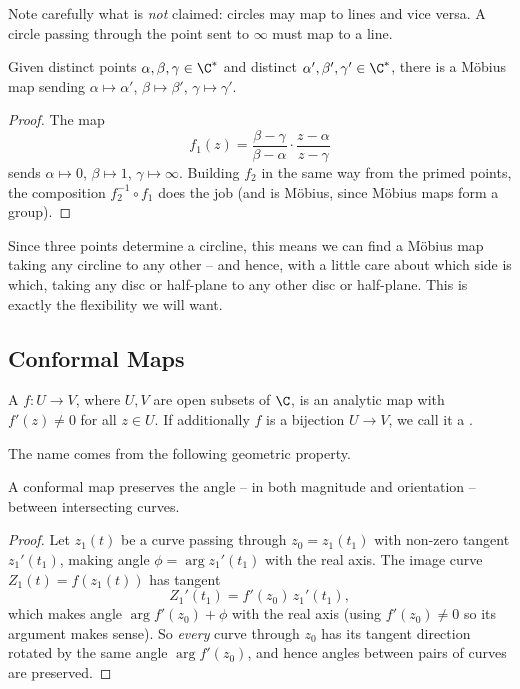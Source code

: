 Note carefully what is \emph{not} claimed: circles may map to lines and vice versa. A circle passing through the point sent to $\infty$ must map to a line.

\begin{proposition}
	Given distinct points $\alpha, \beta, \gamma \in \C^*$ and distinct $\alpha', \beta', \gamma' \in \C^*$, there is a M\"obius map sending $\alpha \mapsto \alpha'$, $\beta \mapsto \beta'$, $\gamma \mapsto \gamma'$.
\end{proposition}
\begin{proof}
	The map
	$$
	f_1(z) = \frac{\beta - \gamma}{\beta - \alpha} \cdot \frac{z - \alpha}{z - \gamma}
	$$
	sends $\alpha \mapsto 0$, $\beta \mapsto 1$, $\gamma \mapsto \infty$. Building $f_2$ in the same way from the primed points, the composition $f_2^{-1} \circ f_1$ does the job (and is M\"obius, since M\"obius maps form a group).
\end{proof}

Since three points determine a circline, this means we can find a M\"obius map taking any circline to any other -- and hence, with a little care about which side is which, taking any disc or half-plane to any other disc or half-plane. This is exactly the flexibility we will want.

\subsection{Conformal Maps}

\begin{definition}
	A  $f : U \to V$, where $U, V$ are open subsets of $\C$, is an analytic map with $f'(z) \neq 0$ for all $z \in U$. If additionally $f$ is a bijection $U \to V$, we call it a .
\end{definition}

The name comes from the following geometric property.

\begin{proposition}
	A conformal map preserves the angle -- in both magnitude and orientation -- between intersecting curves.
\end{proposition}
\begin{proof}
	Let $z_1(t)$ be a curve passing through $z_0 = z_1(t_1)$ with non-zero tangent $z_1'(t_1)$, making angle $\phi = \arg z_1'(t_1)$ with the real axis. The image curve $Z_1(t) = f(z_1(t))$ has tangent
	$$
	Z_1'(t_1) = f'(z_0) \, z_1'(t_1),
	$$
	which makes angle $\arg f'(z_0) + \phi$ with the real axis (using $f'(z_0) \neq 0$ so its argument makes sense). So \emph{every} curve through $z_0$ has its tangent direction rotated by the same angle $\arg f'(z_0)$, and hence angles between pairs of curves are preserved.
\end{proof}

